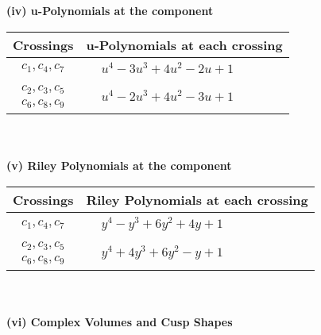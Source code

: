 \documentclass[1p]{elsarticle_modified}
\theoremstyle{definition}
\begin{document}
\newpage\renewcommand{\arraystretch}{1}
\flushleft \textbf{(iv) u-Polynomials at the component}\newline \\
\begin{tabular}{m{50pt}|m{274pt}}
Crossings & \hspace{64pt}u-Polynomials at each crossing \\
\hline $$\begin{aligned}c_{1},c_{4},c_{7}\end{aligned}$$&$\begin{aligned}
&u^4-3 u^3+4 u^2-2 u+1
\end{aligned}$\\
\hline $$\begin{aligned}c_{2},c_{3},c_{5}\\c_{6},c_{8},c_{9}\end{aligned}$$&$\begin{aligned}
&u^4-2 u^3+4 u^2-3 u+1
\end{aligned}$\\
\hline
\end{tabular}\\~\\
\newpage\renewcommand{\arraystretch}{1}
\flushleft \textbf{(v) Riley Polynomials at the component}\newline \\
\begin{tabular}{m{50pt}|m{274pt}}
Crossings & \hspace{64pt}Riley Polynomials at each crossing \\
\hline $$\begin{aligned}c_{1},c_{4},c_{7}\end{aligned}$$&$\begin{aligned}
&y^4- y^3+6 y^2+4 y+1
\end{aligned}$\\
\hline $$\begin{aligned}c_{2},c_{3},c_{5}\\c_{6},c_{8},c_{9}\end{aligned}$$&$\begin{aligned}
&y^4+4 y^3+6 y^2- y+1
\end{aligned}$\\
\hline
\end{tabular}\\~\\
\newpage\flushleft \textbf{(vi) Complex Volumes and Cusp Shapes}
\end{document}
